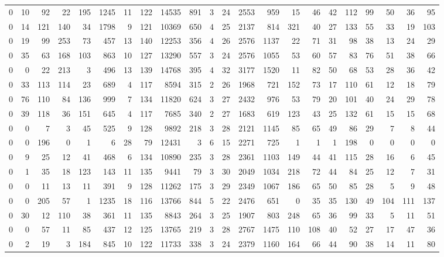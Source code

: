 {\begin{landscape}
\begin{longtable}[c]{lrrrrrrrrrrrrrrrrrrrrr}
\hline
\endhead
%
0 & 10 & 92 & 22 & 195 & 1245 & 11 & 122 & 14535 & 891 & 3 & 24 & 2553 & 959 & 15 & 46 & 42 & 112 & 99 & 50 & 36 & 95 \\
0 & 14 & 121 & 140 & 34 & 1798 & 9 & 121 & 10369 & 650 & 4 & 25 & 2137 & 814 & 321 & 40 & 27 & 133 & 55 & 33 & 19 & 103 \\
0 & 19 & 99 & 253 & 73 & 457 & 13 & 140 & 12253 & 356 & 4 & 26 & 2576 & 1137 & 22 & 71 & 31 & 98 & 38 & 13 & 24 & 29 \\
0 & 35 & 63 & 168 & 103 & 863 & 10 & 127 & 13290 & 557 & 3 & 24 & 2576 & 1055 & 53 & 60 & 57 & 83 & 76 & 51 & 38 & 66 \\
0 & 0 & 22 & 213 & 3 & 496 & 13 & 139 & 14768 & 395 & 4 & 32 & 3177 & 1520 & 11 & 82 & 50 & 68 & 53 & 28 & 36 & 42 \\
0 & 33 & 113 & 114 & 23 & 689 & 4 & 117 & 8594 & 315 & 2 & 26 & 1968 & 721 & 152 & 73 & 17 & 110 & 61 & 12 & 18 & 79 \\
0 & 76 & 110 & 84 & 136 & 999 & 7 & 134 & 11820 & 624 & 3 & 27 & 2432 & 976 & 53 & 79 & 20 & 101 & 40 & 24 & 29 & 78 \\
0 & 39 & 118 & 36 & 151 & 645 & 4 & 117 & 7685 & 340 & 2 & 27 & 1683 & 619 & 123 & 43 & 25 & 132 & 61 & 15 & 15 & 68 \\
0 & 0 & 7 & 3 & 45 & 525 & 9 & 128 & 9892 & 218 & 3 & 28 & 2121 & 1145 & 85 & 65 & 49 & 86 & 29 & 7 & 8 & 44 \\
0 & 0 & 196 & 0 & 1 & 6 & 28 & 79 & 12431 & 3 & 6 & 15 & 2271 & 725 & 1 & 1 & 1 & 198 & 0 & 0 & 0 & 0 \\
0 & 9 & 25 & 12 & 41 & 468 & 6 & 134 & 10890 & 235 & 3 & 28 & 2361 & 1103 & 149 & 44 & 41 & 115 & 28 & 16 & 6 & 45 \\
0 & 1 & 35 & 18 & 123 & 143 & 11 & 135 & 9441 & 79 & 3 & 30 & 2049 & 1034 & 218 & 72 & 44 & 84 & 25 & 12 & 7 & 31 \\
0 & 0 & 11 & 13 & 11 & 391 & 9 & 128 & 11262 & 175 & 3 & 29 & 2349 & 1067 & 186 & 65 & 50 & 85 & 28 & 5 & 9 & 48 \\
0 & 0 & 205 & 57 & 1 & 1235 & 18 & 116 & 13766 & 844 & 5 & 22 & 2476 & 651 & 0 & 35 & 35 & 130 & 49 & 104 & 111 & 137 \\
0 & 30 & 12 & 110 & 38 & 361 & 11 & 135 & 8843 & 264 & 3 & 25 & 1907 & 803 & 248 & 65 & 36 & 99 & 33 & 5 & 11 & 51 \\
0 & 0 & 57 & 11 & 85 & 437 & 12 & 125 & 13765 & 219 & 3 & 28 & 2767 & 1475 & 110 & 108 & 40 & 52 & 27 & 17 & 47 & 36 \\
0 & 2 & 19 & 3 & 184 & 845 & 10 & 122 & 11733 & 338 & 3 & 24 & 2379 & 1160 & 164 & 66 & 44 & 90 & 38 & 14 & 11 & 80 \\

\end{longtable}
\end{landscape}}
